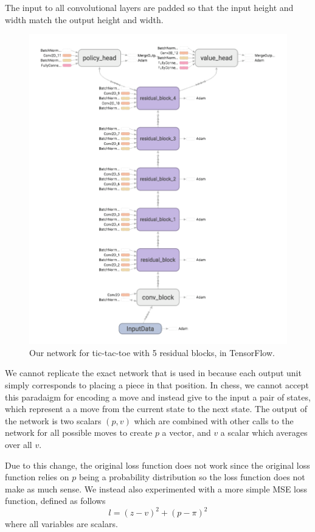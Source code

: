 \documentclass[english]{article}
\begin{document}
The input to all convolutional layers are padded so that the input height and
width match the output height and width.

\begin{figure}
	\centering
    \includegraphics[scale=0.12]{network}
    \caption{Our network for tic-tac-toe with 5 residual blocks, in TensorFlow.}
\end{figure}


We cannot replicate the exact network that is used in \cite{AlphaGo} because
each output unit simply corresponds to placing a piece in that position. In
chess, we cannot accept this paradaigm for encoding a move and instead give to
the input a pair of states, which represent a a move from the current state to
the next state. The output of the network is two scalars $(p, v)$ which are
combined with other calls to the network for all possible moves to create $p$ a
vector, and $v$ a scalar which averages over all $v$.

Due to this change, the original loss function does not work since the original
loss function relies on $p$ being a probability distribution so the loss
function does not make as much sense. We instead also experimented with a more
simple MSE loss function, defined as follows
$$l=(z-v)^2+(p-\pi)^2$$
where all variables are scalars.
\end{document}
